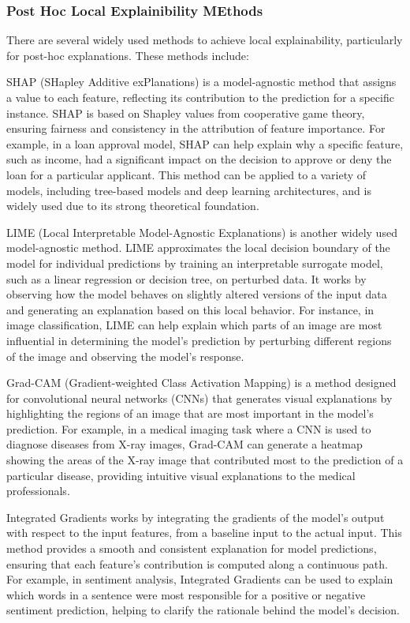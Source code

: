 \subsubsection{Post Hoc Local Explainibility MEthods}
There are several widely used methods to achieve local explainability, particularly for post-hoc explanations. These methods include:

SHAP (SHapley Additive exPlanations) \cite{Lundberg2017AUA} is a model-agnostic method that assigns a value to each feature, reflecting its contribution to the prediction for a specific instance. SHAP is based on Shapley values from cooperative game theory, ensuring fairness and consistency in the attribution of feature importance. For example, in a loan approval model, SHAP can help explain why a specific feature, such as income, had a significant impact on the decision to approve or deny the loan for a particular applicant. This method can be applied to a variety of models, including tree-based models and deep learning architectures, and is widely used due to its strong theoretical foundation.

LIME (Local Interpretable Model-Agnostic Explanations) \cite{Ribeiro2016WhySI} is another widely used model-agnostic method. LIME approximates the local decision boundary of the model for individual predictions by training an interpretable surrogate model, such as a linear regression or decision tree, on perturbed data. It works by observing how the model behaves on slightly altered versions of the input data and generating an explanation based on this local behavior. For instance, in image classification, LIME can help explain which parts of an image are most influential in determining the model's prediction by perturbing different regions of the image and observing the model's response.

Grad-CAM (Gradient-weighted Class Activation Mapping) \cite{Selvaraju2016GradCAMVE} is a method designed for convolutional neural networks (CNNs) that generates visual explanations by highlighting the regions of an image that are most important in the model's prediction. For example, in a medical imaging task where a CNN is used to diagnose diseases from X-ray images, Grad-CAM can generate a heatmap showing the areas of the X-ray image that contributed most to the prediction of a particular disease, providing intuitive visual explanations to the medical professionals.

Integrated Gradients \cite{Sundararajan2017AxiomaticAF} works by integrating the gradients of the model’s output with respect to the input features, from a baseline input to the actual input. This method provides a smooth and consistent explanation for model predictions, ensuring that each feature’s contribution is computed along a continuous path. For example, in sentiment analysis, Integrated Gradients can be used to explain which words in a sentence were most responsible for a positive or negative sentiment prediction, helping to clarify the rationale behind the model's decision.

